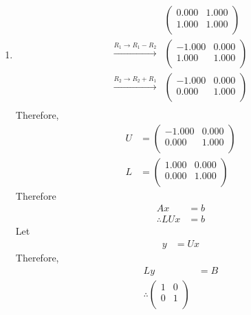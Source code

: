 \documentclass[fleqn, a4paper, 11pt, oneside]{amsart}
\theoremstyle{definition}
\theoremstyle{theorem}
\begin{document}
\begin{solution}
	\begin{enumerate}[leftmargin=*]
		\item
			\begin{align*}
				&
					\begin{pmatrix}
						0.000 & 1.000 \\
						1.000 & 1.000 \\
					\end{pmatrix}\\
				\xrightarrow{R_1 \to R_1 - R_2}&
					\begin{pmatrix}
						-1.000 & 0.000 \\
						1.000  & 1.000 \\
					\end{pmatrix}\\
				\xrightarrow{R_2 \to R_2 + R_1}&
					\begin{pmatrix}
						-1.000 & 0.000 \\
						0.000  & 1.000 \\
					\end{pmatrix}\\
			\end{align*}
			Therefore,
			\begin{align*}
				U &=
					\begin{pmatrix}
						-1.000 & 0.000 \\
						0.000  & 1.000 \\
					\end{pmatrix}\\
				L &=
					\begin{pmatrix}
						1.000 & 0.000 \\
						0.000 & 1.000 \\
					\end{pmatrix}
			\end{align*}
			Therefore
			\begin{align*}
				A x              & = b \\
				\therefore L U x & = b
			\end{align*}
			Let
			\begin{align*}
				y & = U x
			\end{align*}
			Therefore,
			\begin{align*}
				L y &= B\\
				\therefore
					\begin{pmatrix}
						1 & 0 \\
						0 & 1 \\
					\end{pmatrix}

\end{align*}
\end{enumerate}
\end{solution}
\end{document}
